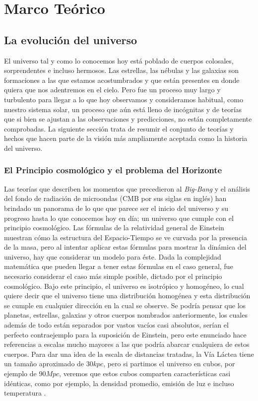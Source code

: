 \chapter[Marco Teórico]{Marco Teórico}
\label{chap:marco}
\section{La evolución del universo}
\label{sec:universo}
El universo tal y como lo conocemos hoy está poblado de cuerpos colosales, sorprendentes e incluso hermosos. Las estrellas, las nébulas y las galaxias son formaciones a las que estamos acostumbrados y que están presentes en donde quiera que nos adentremos en el cielo. Pero fue un proceso muy largo y turbulento para llegar a lo que hoy observamos y consideramos habitual, como nuestro sistema solar, un proceso que aún está lleno de incógnitas y de teorías que si bien se ajustan a las observaciones y predicciones, no están completamente comprobadas. La siguiente sección trata de resumir el conjunto de teorías y hechos que hacen parte de la visión más ampliamente aceptada como la historia del universo.


\subsection{El Principio cosmológico y el problema del Horizonte}
Las teorías que describen los momentos que precedieron al \textit{Big-Bang} y el análisis del fondo de radiación de microondas (CMB por sus siglas en inglés) han brindado un panorama de lo que que parece ser el inicio del universo y su progreso hasta lo que conocemos hoy en día; un universo que cumple con el principio cosmológico\cite{loeb}. Las fórmulas de la relatividad general de Einstein muestran cómo la estructura del Espacio-Tiempo se ve curvada por la presencia de la masa, pero al intentar aplicar estas fórmulas para mostrar la dinámica del universo, hay que considerar un modelo para éste. Dada la complejidad matemática que pueden llegar a tener estas fórmulas en el caso general, fue necesario considerar el caso más simple posible, dictado por el principio cosmológico. Bajo este principio, el universo es isotrópico y homogéneo, lo cual quiere decir que el universo tiene una distribución homogénea y esta distribución se cumple en cualquier dirección en la cual se observe. Se podría pensar que los planetas, estrellas, galaxias y otros cuerpos nombrados anteriormente, los cuales además de todo están separados por vastos vacíos casi absolutos, serían el perfecto contraejemplo para la suposición de Einstein, pero este enunciado hace referencias a escalas mucho mayores a las que podría abarcar cualquiera de estos cuerpos. Para dar una idea de la escala de distancias tratadas, la Vía Láctea tiene un tamaño aproximado de $30kpc$, pero si partimos el universo en cubos, por ejemplo de $90Mpc$, veremos que estos cubos comparten características casi idénticas, como por ejemplo, la densidad promedio, emisión de luz e incluso temperatura \cite{bang}. 

